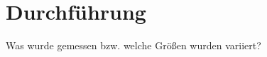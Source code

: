\section{Durchführung}
\label{sec:Durchführung}

Was wurde gemessen bzw. welche Größen wurden variiert?